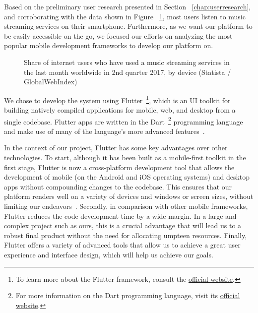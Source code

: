 Based on the preliminary user research presented in Section ~\ref{chap:userresearch}, and corroborating with the data shown in Figure ~\ref{chart:devices}, most users listen to music streaming services on their smartphone. Furthermore, as we want our platform to be easily accessible on the go, we focused our efforts on analyzing the most popular mobile development frameworks to develop our platform on.

\begin{figure}
	\centering
	\caption{Share of internet users who have used a music streaming services in the last month worldwide in 2nd quarter 2017, by device (Statista / GlobalWebIndex)}
	\label{chart:devices}
	\begin{bchart}[step=10,max=45,unit=\%,width=0.8\textwidth]
            \smallskip
            \smallskip
    \end{bchart}
\end{figure}


We chose to develop the system using Flutter~\footnote{To learn more about the Flutter framework, consult the \href{https://flutter.dev/}{official website}.}, which is an \ac{UI} toolkit for building natively compiled applications for mobile, web, and desktop from a single codebase. Flutter apps are written in the Dart~\footnote{For more information on the Dart programming language, visit its \href{https://dart.dev/}{official website}.} programming language and make use of many of the language's more advanced features~\cite{Payne2019}.

In the context of our project, Flutter has some key advantages over other technologies. To start, although it has been built as a mobile-first toolkit in the first stage, Flutter is now a cross-platform development tool that allows the development of mobile (on the Android and iOS operating systems) and desktop apps without compounding changes to the codebase. This ensures that our platform renders well on a variety of devices and windows or screen sizes, without limiting our endeavors~\cite{H.GillbertMiller2011}. Secondly, in comparison with other mobile frameworks, Flutter reduces the code development time by a wide margin. In a large and complex project such as ours, this is a crucial advantage that will lead us to a robust final product without the need for allocating umpteen resources. Finally, Flutter offers a variety of advanced tools that allow us to achieve a great user experience and interface design, which will help us achieve our goals. ~\cite{Payne2019}

